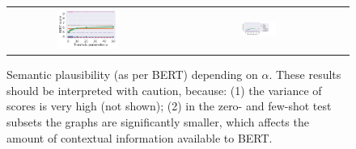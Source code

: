\begin{figure}[t]
	\centering
	\centering
	\setlength{\tabcolsep}{0pt}
	\begin{tabular}{cc}
		\includegraphics[align=c,width=0.4\textwidth,trim={0 0 0 0},clip]{sem_plaus_1_0_vs_a.pdf} & 
        {\includegraphics[align=c,width=0.2\textwidth,trim={13.5cm 3cm 5.5cm 1.5cm},clip]{sem_plaus_legend.pdf}}\\
	\end{tabular}
	\vspace{-5pt}
	\caption{\small Semantic plausibility (as per BERT) depending on $\alpha$. These results should be interpreted with caution, because: (1) the variance of scores is very high (not shown); (2) in the zero- and few-shot test subsets the graphs are significantly smaller, which affects the amount of contextual information available to BERT. }
	\label{fig:results_semantic}
\end{figure}

